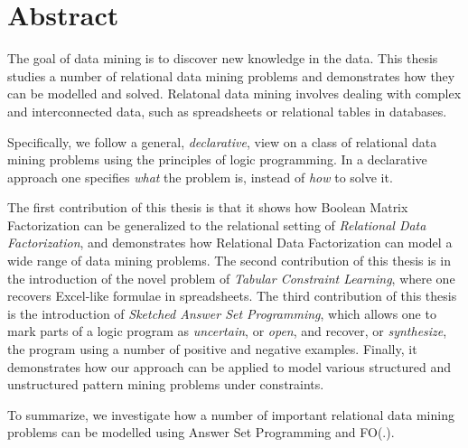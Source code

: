 \chapter{Abstract} \label{ch:abstract}
The goal of data mining is to discover new knowledge in the data. This
thesis studies a number of relational data mining problems and
demonstrates how they can be modelled and solved. Relatonal data
mining involves dealing with complex and interconnected data, such as
spreadsheets or relational tables in databases. 

Specifically, we follow a general, \textit{declarative}, view on a
class of relational data mining problems using the principles of logic
programming. In a declarative approach one specifies \textit{what} the
problem is, instead of \textit{how} to solve it. 

The first contribution of this thesis is that it shows how Boolean Matrix Factorization can be generalized to the
relational setting of \textit{Relational Data Factorization}, and 
demonstrates how Relational Data Factorization can model a wide range of data mining problems. The
second contribution of this thesis is in the introduction of the novel
problem of \textit{Tabular Constraint Learning}, where one recovers
Excel-like formulae in spreadsheets. The third contribution of this
thesis is the introduction of \textit{Sketched Answer Set
Programming}, which allows one to mark parts of a logic program as
\textit{uncertain}, or \textit{open}, and recover, or
\textit{synthesize}, the program using a number of positive and
negative examples. Finally, it demonstrates how our approach can be
applied to model various structured and unstructured pattern mining
problems under constraints.

\pubrev
To summarize, we investigate how a number of important relational data
mining problems can be modelled using Answer Set Programming and FO(.). 
\pubrevend

\cleardoublepage

